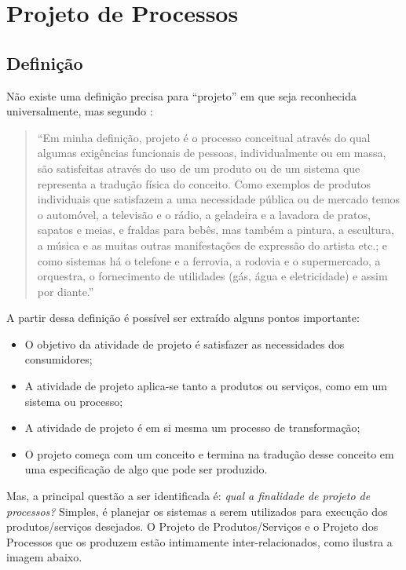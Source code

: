 \chapter[Projeto de Processos]{Projeto de Processos}
\label{chap:processos}

	\section[Definição]{Definição}
	\label{sec:processos_definicao}
	
		Não existe uma definição precisa para “projeto” em que seja reconhecida universalmente, mas segundo \cite{sir}: 

		\begin{quotation}
			“Em minha definição, projeto é o processo conceitual através do qual algumas exigências funcionais de pessoas, individualmente ou em massa, são satisfeitas através do uso de um produto ou de um sistema que representa a tradução física do conceito. Como exemplos de produtos individuais que satisfazem a uma necessidade pública ou de mercado temos o automóvel, a televisão e o rádio, a geladeira e a lavadora de pratos, sapatos e meias, e fraldas para bebês, mas também a pintura, a escultura, a música e as muitas outras manifestações de expressão do artista etc.; e como sistemas há o telefone e a ferrovia, a rodovia e o supermercado, a orquestra, o fornecimento de utilidades (gás, água e eletricidade) e assim por diante.”
		\end{quotation}

		A partir dessa definição é possível ser extraído alguns pontos importante:

		\begin{itemize}
			\item{O objetivo da atividade de projeto é satisfazer as necessidades dos consumidores;}
			\item{A atividade de projeto aplica-se tanto a produtos ou serviços, como em um sistema ou processo;}
			\item{A atividade de projeto é em si mesma um processo de transformação;}
			\item{O projeto começa com um conceito e termina na tradução desse conceito em uma especificação de algo que pode ser produzido.}
		\end{itemize}

		Mas, a principal questão a ser identificada é: \emph{qual a finalidade de projeto de processos?} Simples, é planejar os sistemas a serem utilizados para execução dos produtos/serviços desejados. O Projeto de Produtos/Serviços e o Projeto dos Processos que os produzem estão intimamente inter-relacionados, como ilustra a imagem abaixo.

